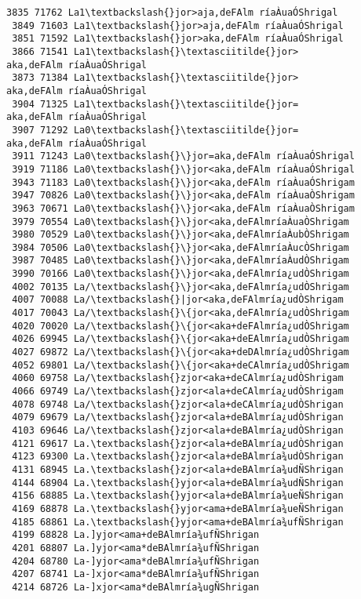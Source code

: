 \documentclass[11pt]{article}
\begin{document}
\begin{Verbatim}[commandchars=\\\{\}]
 3835 71762 La1\textbackslash{}jor>aja,deFAlm ríaÀuaÓShrigal
 3849 71603 La1\textbackslash{}jor>aja,deFAlm ríaÀuaÓShrigal
 3851 71592 La1\textbackslash{}jor>aka,deFAlm ríaÀuaÓShrigal
 3866 71541 La1\textbackslash{}\textasciitilde{}jor>aka,deFAlm ríaÀuaÓShrigal
 3873 71384 La1\textbackslash{}\textasciitilde{}jor>aka,deFAlm ríaÀuaÓShrigal
 3904 71325 La1\textbackslash{}\textasciitilde{}jor=aka,deFAlm ríaÀuaÓShrigal
 3907 71292 La0\textbackslash{}\textasciitilde{}jor=aka,deFAlm ríaÀuaÓShrigal
 3911 71243 La0\textbackslash{}\}jor=aka,deFAlm ríaÀuaÓShrigal
 3919 71186 La0\textbackslash{}\}jor<aka,deFAlm ríaÀuaÓShrigal
 3943 71183 La0\textbackslash{}\}jor<aka,deFAlm ríaÀuaÓShrigam
 3947 70826 La0\textbackslash{}\}jor<aka,deFAlm ríaÀuaÒShrigam
 3963 70671 La0\textbackslash{}\}jor<aka,deFAlm ríaÀuaÒShrigam
 3979 70554 La0\textbackslash{}\}jor<aka,deFAlmríaÀuaÒShrigam
 3980 70529 La0\textbackslash{}\}jor<aka,deFAlmríaÀubÒShrigam
 3984 70506 La0\textbackslash{}\}jor<aka,deFAlmríaÀucÒShrigam
 3987 70485 La0\textbackslash{}\}jor<aka,deFAlmríaÀudÒShrigam
 3990 70166 La0\textbackslash{}\}jor<aka,deFAlmría¿udÒShrigam
 4002 70135 La/\textbackslash{}\}jor<aka,deFAlmría¿udÒShrigam
 4007 70088 La/\textbackslash{}|jor<aka,deFAlmría¿udÒShrigam
 4017 70043 La/\textbackslash{}\{jor<aka,deFAlmría¿udÒShrigam
 4020 70020 La/\textbackslash{}\{jor<aka+deFAlmría¿udÒShrigam
 4026 69945 La/\textbackslash{}\{jor<aka+deEAlmría¿udÒShrigam
 4027 69872 La/\textbackslash{}\{jor<aka+deDAlmría¿udÒShrigam
 4052 69801 La/\textbackslash{}\{jor<aka+deCAlmría¿udÒShrigam
 4060 69758 La/\textbackslash{}zjor<aka+deCAlmría¿udÒShrigam
 4066 69749 La/\textbackslash{}zjor<ala+deCAlmría¿udÒShrigam
 4078 69748 La/\textbackslash{}zjor<ala+deCAlmría¿udÒShrigan
 4079 69679 La/\textbackslash{}zjor<ala+deBAlmría¿udÒShrigan
 4103 69646 La/\textbackslash{}zjor<ala+deBAlmría¿udÒShrigan
 4121 69617 La.\textbackslash{}zjor<ala+deBAlmría¿udÒShrigan
 4123 69300 La.\textbackslash{}zjor<ala+deBAlmría¾udÒShrigan
 4131 68945 La.\textbackslash{}zjor<ala+deBAlmría¾udÑShrigan
 4144 68904 La.\textbackslash{}yjor<ala+deBAlmría¾udÑShrigan
 4156 68885 La.\textbackslash{}yjor<ala+deBAlmría¾ueÑShrigan
 4169 68878 La.\textbackslash{}yjor<ama+deBAlmría¾ueÑShrigan
 4185 68861 La.\textbackslash{}yjor<ama+deBAlmría¾ufÑShrigan
 4199 68828 La.]yjor<ama+deBAlmría¾ufÑShrigan
 4201 68807 La.]yjor<ama*deBAlmría¾ufÑShrigan
 4204 68780 La-]yjor<ama*deBAlmría¾ufÑShrigan
 4207 68741 La-]xjor<ama*deBAlmría¾ufÑShrigan
 4214 68726 La-]xjor<ama*deBAlmría¾ugÑShrigan

\end{Verbatim}
\end{document}
